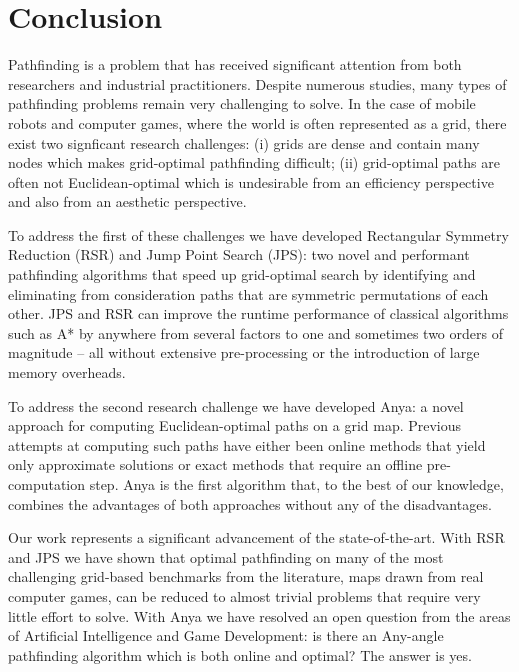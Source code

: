 \chapter{Conclusion}
\label{cha::conclusion}

Pathfinding is a problem that has received significant attention from both
researchers and industrial practitioners. Despite numerous studies, many types
of pathfinding problems remain very challenging to solve. In the case of
mobile robots and computer games, where the world is often represented as a
grid, there exist two signficant research challenges: (i) grids are dense and
contain many nodes which makes grid-optimal pathfinding difficult; (ii)
grid-optimal paths are often not Euclidean-optimal which is undesirable from
an efficiency perspective and also from an aesthetic perspective.

To address the first of these challenges we have developed Rectangular
Symmetry Reduction (RSR) and Jump Point Search (JPS): two novel and performant
pathfinding algorithms that speed up grid-optimal search by identifying and
eliminating from consideration paths that are symmetric permutations of each
other.  JPS and RSR can improve the runtime performance of classical
algorithms such as A{*} by anywhere from several factors to one and sometimes
two orders of magnitude -- all without extensive pre-processing or the
introduction of large memory overheads.

To address the second research challenge we have developed Anya: a novel
approach for computing Euclidean-optimal paths on a grid map. Previous
attempts at computing such paths have either been online methods that yield
only approximate solutions or exact methods that require an offline
pre-computation step.  Anya is the first algorithm that, to the best of our
knowledge, combines the advantages of both approaches without any of the
disadvantages.

Our work represents a significant advancement of the state-of-the-art. With
RSR and JPS we have shown that optimal pathfinding on many of the most
challenging grid-based benchmarks from the literature, maps drawn from real
computer games, can be reduced to almost trivial problems that require very
little effort to solve.  With Anya we have resolved an open question from the
areas of Artificial Intelligence and Game Development: is there an Any-angle
pathfinding algorithm which is both online and optimal?  The answer is yes.

\newpage

